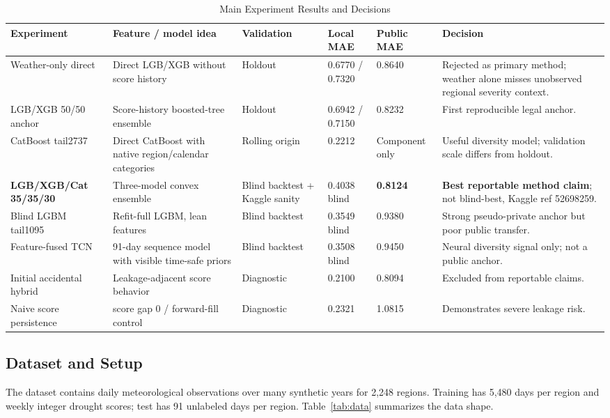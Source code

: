 \documentclass[conference]{IEEEtran}
\begin{document}
\begin{table}[!t]
\centering
\caption{Main Experiment Results and Decisions}
\label{tab:model_results}
\scriptsize
\setlength{\tabcolsep}{3pt}
\begin{tabular}{p{}p{}p{}p{}p{}p{}}
\hline
\textbf{Experiment} & \textbf{Feature / model idea} & \textbf{Validation} &
\textbf{Local MAE} & \textbf{Public MAE} & \textbf{Decision} \\
\hline
Weather-only direct & Direct LGB/XGB without score history & Holdout &
0.6770 / 0.7320 & 0.8640 & Rejected as primary method; weather alone misses
unobserved regional severity context. \\
LGB/XGB 50/50 anchor & Score-history boosted-tree ensemble & Holdout &
0.6942 / 0.7150 & 0.8232 & First reproducible legal anchor. \\
CatBoost tail2737 & Direct CatBoost with native region/calendar categories &
Rolling origin & 0.2212 & Component only & Useful diversity model; validation
scale differs from holdout. \\
\textbf{LGB/XGB/Cat 35/35/30} & Three-model convex ensemble & Blind backtest +
Kaggle sanity & 0.4038 blind & \textbf{0.8124} & \textbf{Best reportable
method claim}; not blind-best, Kaggle ref 52698259. \\
Blind LGBM tail1095 & Refit-full LGBM, lean features & Blind backtest &
0.3549 blind & 0.9380 & Strong pseudo-private anchor but poor public transfer. \\
Feature-fused TCN & 91-day sequence model with visible time-safe priors &
Blind backtest & 0.3508 blind & 0.9450 & Neural diversity signal only; not a
public anchor. \\
Initial accidental hybrid & Leakage-adjacent score behavior & Diagnostic &
0.2100 & 0.8094 & Excluded from reportable claims. \\
Naive score persistence & score gap 0 / forward-fill control & Diagnostic &
0.2321 & 1.0815 & Demonstrates severe leakage risk. \\
\hline
\end{tabular}
\end{table}

\subsection{Dataset and Setup}
The dataset contains daily meteorological observations over many synthetic
years for 2,248 regions. Training has 5,480 days per region and weekly integer
drought scores; test has 91 unlabeled days per region. Table~\ref{tab:data}
summarizes the data shape.
\end{document}
